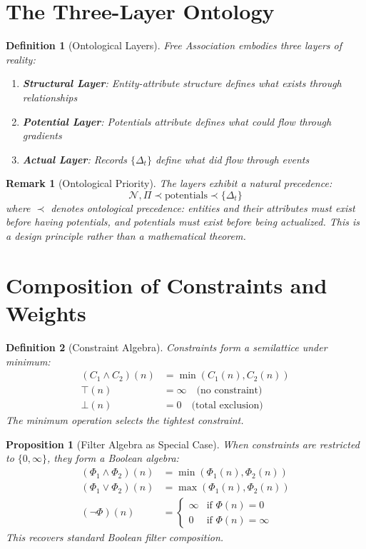 \documentclass[11pt]{article}
\newtheorem{definition}{Definition}
\newtheorem{proposition}{Proposition}
\newtheorem{remark}{Remark}
\begin{document}
\section{The Three-Layer Ontology}

\begin{definition}[Ontological Layers]
Free Association embodies three layers of reality:
\begin{enumerate}
\item \textbf{Structural Layer}: Entity-attribute structure defines what exists through relationships
\item \textbf{Potential Layer}: Potentials attribute defines what \emph{could} flow through gradients
\item \textbf{Actual Layer}: Records $\{\Delta_t\}$ define what \emph{did} flow through events
\end{enumerate}
\end{definition}

\begin{remark}[Ontological Priority]
The layers exhibit a natural precedence:
\[
\mathcal{N}, \Pi \prec \text{potentials} \prec \{\Delta_t\}
\]
where $\prec$ denotes ontological precedence: entities and their attributes must exist before having potentials, and potentials must exist before being actualized. This is a design principle rather than a mathematical theorem.
\end{remark}

\section{Composition of Constraints and Weights}

\begin{definition}[Constraint Algebra]
Constraints form a semilattice under minimum:
\begin{align}
(C_1 \wedge C_2)(n) &= \min(C_1(n), C_2(n)) \\
\top(n) &= \infty \quad \text{(no constraint)} \\
\bot(n) &= 0 \quad \text{(total exclusion)}
\end{align}
The minimum operation selects the tightest constraint.
\end{definition}

\begin{proposition}[Filter Algebra as Special Case]
When constraints are restricted to $\{0, \infty\}$, they form a Boolean algebra:
\begin{align}
(\Phi_1 \land \Phi_2)(n) &= \min(\Phi_1(n), \Phi_2(n)) \\
(\Phi_1 \lor \Phi_2)(n) &= \max(\Phi_1(n), \Phi_2(n)) \\
(\neg \Phi)(n) &= \begin{cases} \infty & \text{if } \Phi(n) = 0 \\ 0 & \text{if } \Phi(n) = \infty \end{cases}
\end{align}
This recovers standard Boolean filter composition.
\end{proposition}
\end{document}
